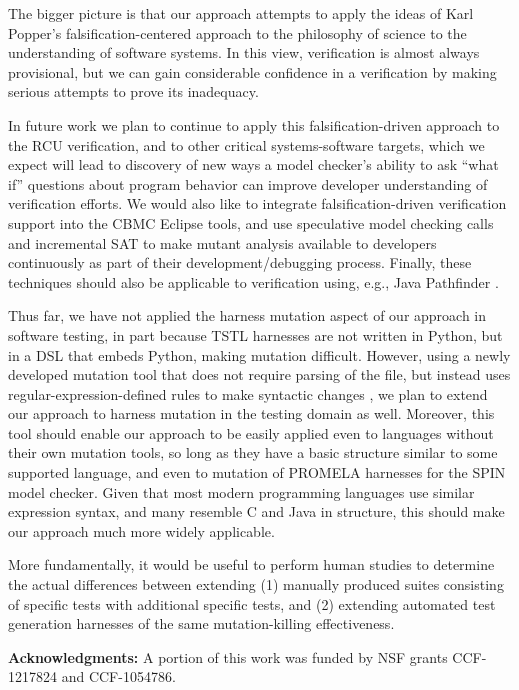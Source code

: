 \documentclass{svjour3}
\begin{document}
The bigger picture is that our approach
attempts to apply the ideas of Karl Popper's falsification-centered
approach to the philosophy of science to the understanding of software
systems.  In this view, verification is almost always provisional, but we can 
gain considerable confidence in a verification by making serious attempts to prove its inadequacy.

In future work we plan to continue to apply this falsification-driven
approach to the RCU verification, and to other critical
systems-software targets, which we expect will lead to discovery of
new ways a model checker's ability to ask ``what if'' questions about
program behavior \cite{GroceDist,MakeMost} can improve developer
understanding of verification efforts.   We would also like to
integrate falsification-driven verification support into the CBMC
Eclipse tools, and use speculative model checking calls and
incremental SAT to make mutant analysis available to developers
continuously as part of their development/debugging process.  Finally,
these techniques should also be applicable to verification using,
e.g., Java Pathfinder \cite{JPF2}.

Thus far, we have not applied the harness mutation aspect of our
approach in software testing, in part because TSTL harnesses are not
written in Python, but in a DSL that embeds Python, making mutation
difficult.  However, using a newly developed mutation tool that does
not require parsing of the file, but instead uses
regular-expression-defined rules to make syntactic changes
\cite{universalmutator}, we plan to extend our approach to harness
mutation in the testing domain as well.  Moreover, this tool should
enable our approach to be easily applied even to languages without
their own mutation tools, so long as they have a basic structure similar to
some supported language, and even to mutation of PROMELA harnesses for
the SPIN model checker.  Given that most modern programming languages
use similar expression syntax, and many resemble C and Java in
structure, this should make our approach much more widely applicable.

More fundamentally, it would be useful to perform human studies to
determine the actual differences between extending (1)
manually produced suites consisting of specific tests with additional specific
tests, and (2) extending automated test generation harnesses of the
same mutation-killing effectiveness. 

{\bf Acknowledgments:}
A portion of this work was funded by NSF grants CCF-1217824
and CCF-1054786.
\end{document}
